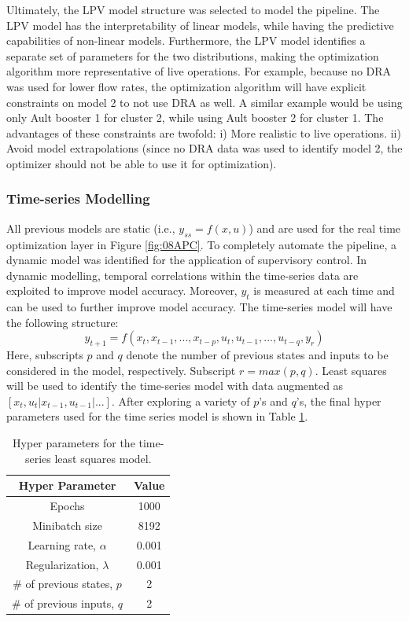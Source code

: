 Ultimately, the LPV model structure was selected to model the pipeline.  The LPV model has the interpretability of linear models, while having the predictive capabilities of non-linear models.  Furthermore, the LPV model identifies a separate set of parameters for the two distributions, making the optimization algorithm more representative of live operations.  For example, because no DRA was used for lower flow rates, the optimization algorithm will have explicit constraints on model 2 to not use DRA as well. A similar example would be using only Ault booster 1 for cluster 2, while using Ault booster 2 for cluster 1.  The advantages of these constraints are twofold: i) More realistic to live operations.  ii) Avoid model extrapolations (since no DRA data was used to identify model 2, the optimizer should not be able to use it for optimization).

\subsubsection{Time-series Modelling}
All previous models are static (i.e., $y_{ss} = f(x, u)$) and are used for the real time optimization layer in Figure \ref{fig:08APC}. To completely automate the pipeline, a dynamic model was identified for the application of supervisory control. In dynamic modelling, temporal correlations within the time-series data are exploited to improve model accuracy.  Moreover, $y_t$ is measured at each time and can be used to further improve model accuracy. The time-series model will have the following structure:
\begin{equation}
    y_{t+1} = f(x_{t}, x_{t - 1}, ..., x_{t-p}, u_{t}, u_{t - 1}, ..., u_{t - q}, y_{r})
\end{equation}
Here, subscripts $p$ and $q$ denote the number of previous states and inputs to be considered in the model, respectively.  Subscript $r = max(p, q)$. Least squares will be used to identify the time-series model with data augmented as $[x_t, u_t | x_{t - 1}, u_{t - 1} | ... ]$.  After exploring a variety of $p$'s and $q$'s, the final hyper parameters used for the time series model is shown in Table \ref{tab:08ts_parameters}.
\begin{table}[h]
    \centering
    {
    \begin{tabular}{ c | c}
        Hyper Parameter                  &  Value       \\
        \hline
        Epochs                           &  1000      \\
        Minibatch size                   &  8192     \\
        Learning rate, $\alpha$          &  0.001    \\
        Regularization, $\lambda$        &  0.001    \\
        $\#$ of previous states, $p$     &  2  \\
        $\#$ of previous inputs, $q$     &  2  \\
    \end{tabular}}
    \caption{Hyper parameters for the time-series least squares model.}
    \label{tab:08ts_parameters}
\end{table}

